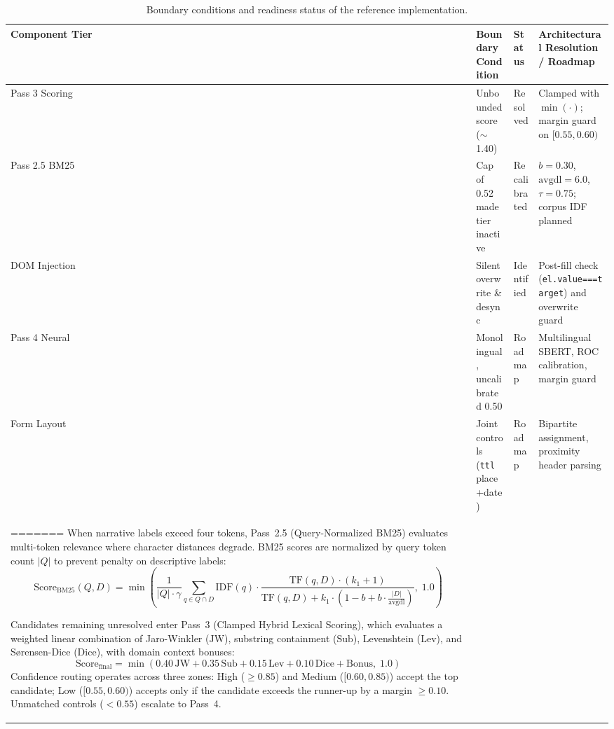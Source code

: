 \documentclass[runningheads,a4paper]{llncs}
\begin{document}
\begin{table}[t]
\caption{Boundary conditions and readiness status of the reference implementation.}
\label{tab:audit}
\centering
\scriptsize
\setlength{\tabcolsep}{3pt}
\renewcommand{\arraystretch}{0.90}
\begin{tabular}{p{2.0cm}p{2.8cm}p{1.4cm}p{5.1cm}}
\toprule
\textbf{Component Tier} & \textbf{Boundary Condition} & \textbf{Status} & \textbf{Architectural Resolution / Roadmap} \\
\midrule
Pass 3 Scoring & Unbounded score ($\sim$1.40) & Resolved & Clamped with $\min(\cdot)$; margin guard on $[0.55,0.60)$ \\
Pass 2.5 BM25 & Cap of 0.52 made tier inactive & Recalibrated & $b{=}0.30$, $\text{avgdl}{=}6.0$, $\tau{=}0.75$; corpus IDF planned \\
DOM Injection & Silent overwrite \& desync & Identified & Post-fill check (\texttt{el.value===target}) and overwrite guard \\
Pass 4 Neural & Monolingual, uncalibrated 0.50 & Roadmap & Multilingual SBERT, ROC calibration, margin guard \\
Form Layout & Joint controls (\texttt{ttl} place+date) & Roadmap & Bipartite assignment, proximity header parsing \\
=======
When narrative labels exceed four tokens, Pass~2.5 (Query-Normalized BM25) evaluates multi-token relevance where character distances degrade. BM25 scores \cite{robertson2009} are normalized by query token count $|Q|$ to prevent penalty on descriptive labels:
\begin{equation}
\text{Score}_{\text{BM25}}(Q, D) = \min\!\left(\frac{1}{|Q| \cdot \gamma} \sum_{q \in Q \cap D} \text{IDF}(q) \cdot \frac{\text{TF}(q, D) \cdot (k_1 + 1)}{\text{TF}(q, D) + k_1 \cdot \left(1 - b + b \cdot \frac{|D|}{\text{avgdl}}\right)},\; 1.0\right)
\label{eq:bm25}
\end{equation}

Candidates remaining unresolved enter Pass~3 (Clamped Hybrid Lexical Scoring), which evaluates a weighted linear combination of Jaro-Winkler ($\text{JW}$), substring containment ($\text{Sub}$), Levenshtein ($\text{Lev}$), and S{\o}rensen-Dice ($\text{Dice}$), with domain context bonuses:
\begin{equation}
\text{Score}_{\text{final}} = \min\!\left(0.40\,\text{JW} + 0.35\,\text{Sub} + 0.15\,\text{Lev} + 0.10\,\text{Dice} + \text{Bonus},\; 1.0\right)
\label{eq:hybrid}
\end{equation}
Confidence routing operates across three zones: High ($\ge 0.85$) and Medium ($[0.60, 0.85)$) accept the top candidate; Low ($[0.55, 0.60)$) accepts only if the candidate exceeds the runner-up by a margin $\ge 0.10$. Unmatched controls ($<0.55$) escalate to Pass~4.


\end{tabular}
\end{table}
\end{document}
